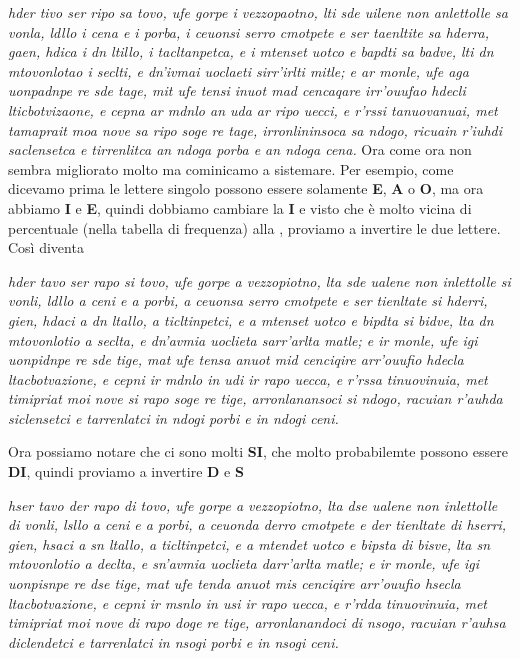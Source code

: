 \documentclass{report}
\begin{document}
\vspace{0.2cm}

\textit{hder tivo ser ripo sa tovo, ufe gorpe i vezzopaotno, lti sde uilene non anlettolle sa vonla, ldllo i cena e i porba, i ceuonsi serro cmotpete e ser taenltite sa hderra, gaen, hdica i dn ltillo, i tacltanpetca, e i mtenset uotco e bapdti sa badve, lti dn mtovonlotao i seclti, e dn’ivmai uoclaeti sirr’irlti mitle; e ar monle, ufe aga uonpadnpe re sde tage, mit ufe tensi inuot mad cencaqare irr’ouufao hdecli lticbotvizaone, e cepna ar mdnlo an uda ar ripo uecci, e r’rssi tanuovanuai, met tamaprait moa nove sa ripo soge re tage, irronlininsoca sa ndogo, ricuain r’iuhdi saclensetca e tirrenlitca an ndoga porba e an ndoga cena.}
\vspace{0.2cm}
Ora come ora non sembra migliorato molto ma cominicamo a sistemare. Per esempio, come dicevamo prima le lettere singolo possono essere solamente \textbf{E}, \textbf{A} o \textbf{O}, ma ora abbiamo \textbf{I} e \textbf{E}, quindi dobbiamo cambiare la \textbf{I} e visto che è molto vicina di percentuale (nella tabella di frequenza) alla , proviamo a invertire le due lettere. Così diventa

\vspace{0.2cm}
\textit{hder tavo ser rapo si tovo, ufe gorpe a vezzopiotno, lta sde ualene non inlettolle si vonli, ldllo a ceni e a porbi, a ceuonsa serro cmotpete e ser tienltate si hderri, gien, hdaci a dn ltallo, a ticltinpetci, e a mtenset uotco e bipdta si bidve, lta dn mtovonlotio a seclta, e dn’avmia uoclieta sarr’arlta matle; e ir monle, ufe igi uonpidnpe re sde tige, mat ufe tensa anuot mid cenciqire arr’ouufio hdecla ltacbotvazione, e cepni ir mdnlo in udi ir rapo uecca, e r’rssa tinuovinuia, met timipriat moi nove si rapo soge re tige, arronlanansoci si ndogo, racuian r’auhda siclensetci e tarrenlatci in ndogi porbi e in ndogi ceni.}

\vspace{0.2cm}

Ora possiamo notare che ci sono molti \textbf{SI}, che molto probabilemte possono essere \textbf{DI}, quindi proviamo a invertire \textbf{D} e \textbf{S}

\vspace{0.2cm}
\textit{hser tavo der rapo di tovo, ufe gorpe a vezzopiotno, lta dse ualene non inlettolle di vonli, lsllo a ceni e a porbi, a ceuonda derro cmotpete e der tienltate di hserri, gien, hsaci a sn ltallo, a ticltinpetci, e a mtendet uotco e bipsta di bisve, lta sn mtovonlotio a declta, e sn’avmia uoclieta darr’arlta matle; e ir monle, ufe igi uonpisnpe re dse tige, mat ufe tenda anuot mis cenciqire arr’ouufio hsecla ltacbotvazione, e cepni ir msnlo in usi ir rapo uecca, e r’rdda tinuovinuia, met timipriat moi nove di rapo doge re tige, arronlanandoci di nsogo, racuian r’auhsa diclendetci e tarrenlatci in nsogi porbi e in nsogi ceni.}
\vspace{0.2cm}
\end{document}
